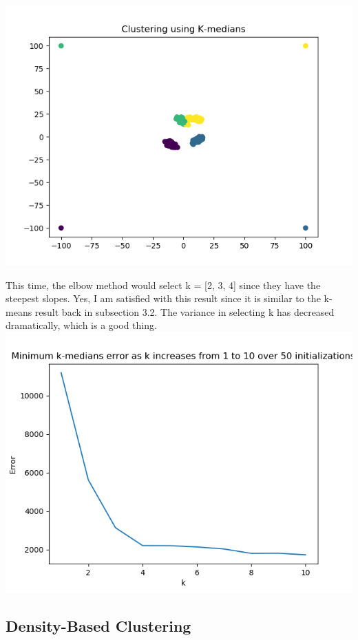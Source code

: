 \documentclass{article}
\begin{document}
{   \includegraphics[scale=0.6]{../figs/kmedians_lowest_error.png} 
\item This time, the elbow method would select k = [2, 3, 4] since they have the steepest slopes. Yes, I am satisfied with this result since it is similar to the k-means result back in subsection 3.2. The variance in selecting k has decreased dramatically, which is a good thing. \\
   \includegraphics[scale=0.6]{../figs/k_medians_cluster_errors.png} 
}


\subsection{Density-Based Clustering}
\end{document}
